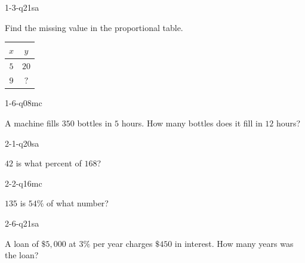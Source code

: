 
\begin{practiceQuestion}{1-3-q21}{sa}
\begin{questionText}
Find the missing value in the proportional table.

\begin{center}
\begin{tabular}{|c|c|}
\hline $x$ & $y$ \\ \hline $5$ & $20$ \\ $9$ & $?$ \\ \hline
\end{tabular}
\end{center}
\end{questionText}
\end{practiceQuestion}

\begin{practiceQuestion}{1-6-q08}{mc}
\begin{questionText}
A machine fills $350$ bottles in $5$ hours. How many bottles does it fill in $12$ hours?
\end{questionText}
\end{practiceQuestion}

\begin{practiceQuestion}{2-1-q20}{sa}
\begin{questionText}
$42$ is what percent of $168$?
\end{questionText}
\end{practiceQuestion}

\begin{practiceQuestion}{2-2-q16}{mc}
\begin{questionText}
$135$ is $54\%$ of what number?
\end{questionText}
\end{practiceQuestion}

\begin{practiceQuestion}{2-6-q21}{sa}
\begin{questionText}
A loan of $\$5{,}000$ at $3\%$ per year charges $\$450$ in interest. How many years was the loan?
\end{questionText}
\end{practiceQuestion}

